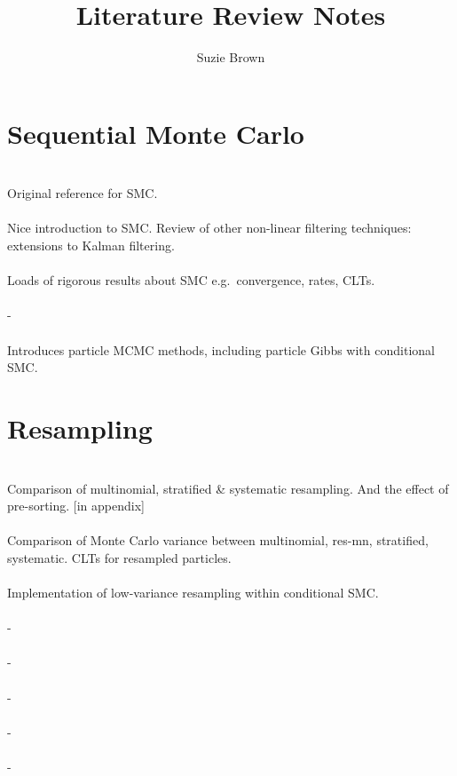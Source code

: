 \documentclass{article}
\title{Literature Review Notes}
\author{Suzie Brown}
\begin{document}
\maketitle

\section*{Sequential Monte Carlo}

\textbf{\citet{gordon1993}}\\
Original reference for SMC.
\\[5pt]
\textbf{\citet{kitagawa1996}}\\
Nice introduction to SMC. Review of other non-linear filtering techniques: extensions to Kalman filtering.
\\[5pt]
\textbf{\citet{delmoral2013}}\\
Loads of rigorous results about SMC e.g.\ convergence, rates, CLTs.
\\[5pt]
\textbf{\citet{doucet2009}}\\
-
\\[5pt]
\textbf{\citet{andrieu2010}}\\
Introduces particle MCMC methods, including particle Gibbs with conditional SMC.

\section*{Resampling}

\textbf{\citet{kitagawa1996}}\\
Comparison of multinomial, stratified \& systematic resampling. And the effect of pre-sorting. [in appendix]
\\[5pt]
\textbf{\citet{douc2005}}\\
Comparison of Monte Carlo variance between multinomial, res-mn, stratified, systematic. CLTs for resampled particles.
\\[5pt]
\textbf{\citet{lee2019}}\\
Implementation of low-variance resampling within conditional SMC.
\\[5pt]
\textbf{\citet{murray2016}}\\
-
\\[5pt]
\textbf{\citet{whitley1994}}\\
-
\\[5pt]
\textbf{\citet{gerber2017}}\\
-
\\[5pt]
\textbf{\citet{li2020}}\\
-
\\[5pt]
\textbf{\citet{delmoral2012}}\\
-
\end{document}
